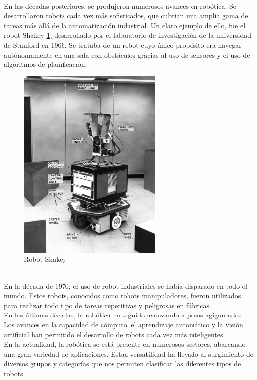 \\
En las décadas posteriores, se produjeron numerosos avances en robótica. Se desarrollaron robots cada vez más sofisticados, que cubrian una amplia gama de tareas más allá de la 
automatización industrial. Un claro ejemplo de ello, fue el robot Shakey \ref{fig:shakey}, desarrollado por el laboratorio de investigación de la universidad de Stanford en 1966. Se trataba 
de un robot cuyo único propósito era navegar autónomamente en una sala con obstáculos gracias al uso de sensores y el uso de algoritmos de planificación.
\begin{figure} [ht!]
  \begin{center}
    \includegraphics[width=7cm]{figs/shakey.jpg}
  \end{center}
  \caption{Robot Shakey}
  \label{fig:shakey}
\end{figure}\
\\ 
En la década de 1970, el uso de robot industriales se había disparado en todo el mundo. Estos robots, conocidos como robots manipuladores, fueron utilizados para 
realizar todo tipo de tareas repetitivas y peligrosas en fábricas.
\\
En las últimas décadas, la robótica ha seguido avanzando a pasos agigantados. Los avances en la capacidad de cómputo, el aprendizaje automático y la visión 
artificial han permitido el desarrollo de robots cada vez más inteligentes.
\\
En la actualidad, la robótica se está presente en numerosos sectores, abarcando una gran variedad de aplicaciones. Estaa versatilidad ha llevado al surgimiento 
de diversos grupos y categorías que nos permiten clasificar las diferentes tipos de robots. 
\newpage

